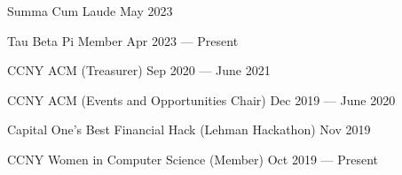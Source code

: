 Summa Cum Laude \hfill May 2023

Tau Beta Pi Member \hfill Apr 2023 --- Present
 
CCNY ACM (Treasurer) \hfill Sep 2020 --- June 2021

CCNY ACM (Events and Opportunities Chair) \hfill Dec 2019 --- June 2020

Capital One's Best Financial Hack (Lehman Hackathon) \hfill Nov 2019

CCNY Women in Computer Science (Member) \hfill Oct 2019 --- Present


